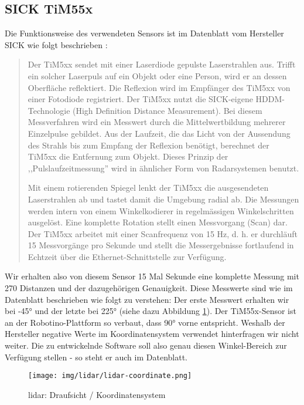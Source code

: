 \subsection{SICK TiM55x}
\label{chap:tim55x}
Die Funktionsweise des verwendeten Sensors ist im Datenblatt vom Hersteller SICK wie folgt beschrieben \cite{tim55x-techinfo}:
\begin{quote}
Der TiM5xx sendet mit einer Laserdiode gepulste Laserstrahlen aus. Trifft ein solcher Laserpuls auf ein Objekt oder eine Person, wird er an dessen Oberfläche reflektiert. Die Reflexion wird im Empfänger des TiM5xx von einer Fotodiode registriert. Der TiM5xx nutzt die SICK-eigene HDDM-Technologie (High Definition Distance Measurement). Bei diesem Messverfahren wird ein Messwert durch die Mittelwertbildung mehrerer Einzelpulse gebildet. Aus der Laufzeit, die das Licht von der Aussendung des Strahls bis zum Empfang der Reflexion benötigt, berechnet der TiM5xx die Entfernung zum Objekt. Dieses Prinzip der ,,Pulslaufzeitmessung'' wird in ähnlicher Form von Radarsystemen benutzt.

Mit einem rotierenden Spiegel lenkt der TiM5xx die ausgesendeten Laserstrahlen ab und tastet damit die Umgebung radial ab. Die Messungen werden intern von einem Winkelkodierer in regelmässigen Winkelschritten ausgelöst. Eine komplette Rotation stellt einen Messvorgang (Scan) dar. Der TiM5xx arbeitet mit einer Scanfrequenz von 15 Hz, d. h. er durchläuft 15 Messvorgänge pro Sekunde und stellt die Messergebnisse fortlaufend in Echtzeit über die Ethernet-Schnittstelle zur Verfügung.
\end{quote}

Wir erhalten also von diesem Sensor 15 Mal Sekunde eine komplette Messung mit 270 Distanzen und der dazugehörigen Genauigkeit. Diese Messwerte sind wie im Datenblatt beschrieben wie folgt zu verstehen: Der erste Messwert erhalten wir bei -45° und der letzte bei 225° (siehe dazu Abbildung \ref{fig:lidar}). Der TiM55x-Sensor ist an der Robotino-Plattform so verbaut, dass 90° vorne entspricht. Weshalb der Hersteller negative Werte im Koordinatensystem verwendet hinterfragen wir nicht weiter. Die zu entwickelnde Software soll also genau diesen Winkel-Bereich zur Verfügung stellen - so steht er auch im Datenblatt.
\begin{figure}[H]
	\centering
	\texttt{[image: img/lidar/lidar-coordinate.png]}
	\caption{\acrshort{lidar}: Draufsicht / Koordinatensystem}
	\label{fig:lidar}
\end{figure}